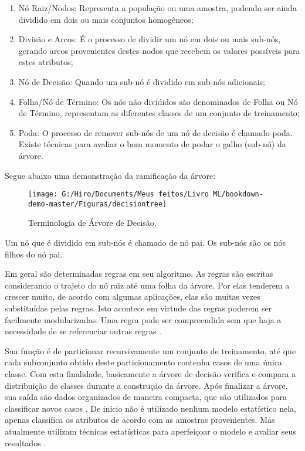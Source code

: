 \documentclass[
]{book}
\begin{document}
\begin{enumerate}
\def\labelenumi{\arabic{enumi}.}
\item
  Nó Raiz/Nodos: Representa a população ou uma amostra, podendo ser ainda dividido em dois ou mais conjuntos homogêneos;
\item
  Divisão e Arcos: É o processo de dividir um nó em dois ou mais sub-nós, gerando arcos provenientes destes nodos que recebem os valores possíveis para estes atributos;
\item
  Nó de Decisão: Quando um sub-nó é dividido em sub-nós adicionais;
\item
  Folha/Nó de Término: Os nós não divididos são denominados de Folha ou Nó de Término, representam as diferentes classes de um conjunto de treinamento;
\item
  Poda: O processo de remover sub-nós de um nó de decisão é chamado poda. Existe técnicas para avaliar o bom momento de podar o galho (sub-nó) da árvore.
\end{enumerate}

Segue abaixo uma demonstração da ramificação da árvore:

\begin{figure}

{\centering \texttt{[image: G:/Hiro/Documents/Meus feitos/Livro ML/bookdown-demo-master/Figuras/decisiontree]} 

}

\caption{Terminologia de Árvore de Decisão.}\label{fig:decisiontree}
\end{figure}



Um nó que é dividido em sub-nós é chamado de nó pai. Os sub-nós são os nós filhos do nó pai.

Em geral são determinadas regras em seu algoritmo. As regras são escritas considerando o trajeto do nó raiz até uma folha da árvore. Por elas tenderem a crescer muito, de acordo com algumas aplicações, elas são muitas vezes substituídas pelas regras. Isto acontece em virtude das regras poderem ser facilmente modularizadas. Uma regra pode ser compreendida sem que haja a necessidade de se referenciar outras regras \citep{ingargiola1996building}.

Sua função é de particionar recursivamente um conjunto de treinamento, até que cada subconjunto obtido deste particionamento contenha casos de uma única classe. Com esta finalidade, basicamente a árvore de decisão verifica e compara a distribuição de classes durante a construção da árvore. Após finalizar a árvore, sua saída são dados organizados de maneira compacta, que são utilizados para classificar novos casos \citep{holsheimer1994data}. De início não é utilizado nenhum modelo estatístico nela, apenas classifica os atributos de acordo com as amostras provenientes. Mas atualmente utilizam técnicas estatísticas para aperfeiçoar o modelo e avaliar seus resultados \citep{shiba2005classificaccao}.
\end{document}
